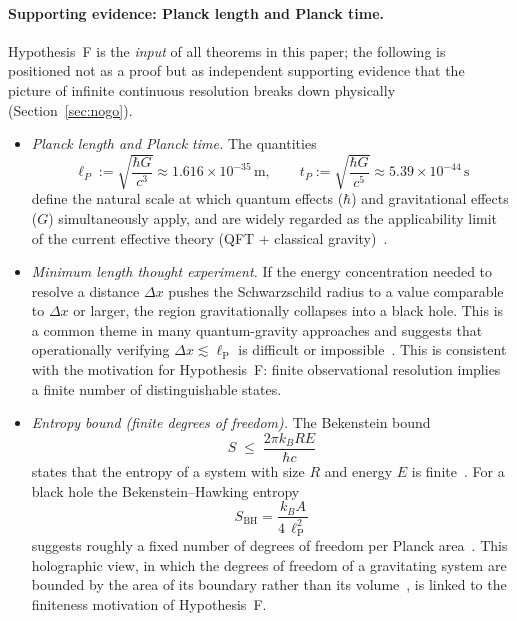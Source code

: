 \documentclass[sn-mathphys-num,Numbered]{sn-jnl}
\theoremstyle{thmstyleone}
\theoremstyle{thmstylethree}
\theoremstyle{thmstyletwo}
\begin{document}
\paragraph{Supporting evidence: Planck length and Planck time.}
Hypothesis~F is the \emph{input} of all theorems in this paper; the
following is positioned not as a proof but as independent supporting
evidence that the picture of infinite continuous resolution breaks
down physically (Section~\ref{sec:nogo}).

\begin{itemize}
  \item \textit{Planck length and Planck time.}
    The quantities
    \[
      \ell_P := \sqrt{\frac{\hbar G}{c^3}} \approx 1.616\times10^{-35}\,\mathrm{m},
      \qquad
      t_P := \sqrt{\frac{\hbar G}{c^5}} \approx 5.39\times10^{-44}\,\mathrm{s}
    \]
    define the natural scale at which quantum effects ($\hbar$) and
    gravitational effects ($G$) simultaneously apply, and are widely
    regarded as the applicability limit of the current effective theory
    (QFT + classical gravity)~\cite{Planck1899}.

  \item \textit{Minimum length thought experiment.}
    If the energy concentration needed to resolve a distance $\Delta x$
    pushes the Schwarzschild radius to a value comparable to $\Delta x$
    or larger, the region gravitationally collapses into a black hole.
    This is a common theme in many quantum-gravity approaches and
    suggests that operationally verifying $\Delta x \lesssim \ell_{\mathrm{P}}$ is
    difficult or impossible~\cite{Maggiore1994}. This is consistent with
    the motivation for Hypothesis~F: finite observational resolution
    implies a finite number of distinguishable states.

  \item \textit{Entropy bound (finite degrees of freedom).}
    The Bekenstein bound
    \[
      S \;\le\; \frac{2\pi k_B R E}{\hbar c}
    \]
    states that the entropy of a system with size $R$ and energy $E$ is
    finite~\cite{Bekenstein1981}. For a black hole the Bekenstein--Hawking
    entropy
    \[
      S_{\mathrm{BH}} = \frac{k_B A}{4\,\ell_{\mathrm{P}}^2}
    \]
    suggests roughly a fixed number of degrees of freedom per Planck
    area~\cite{Hawking1975}. This holographic view, in which the degrees
    of freedom of a gravitating system are bounded by the area of its
    boundary rather than its volume~\cite{tHooft1993,Susskind1995,Bousso2002}, is
    linked to the finiteness motivation of Hypothesis~F.
\end{itemize}
\end{document}
